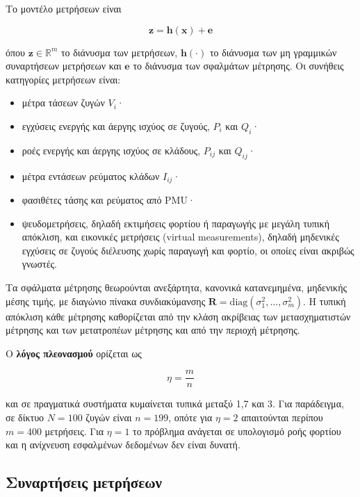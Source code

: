 Το μοντέλο μετρήσεων είναι

\begin{equation}
\mathbf{z} = \mathbf{h}(\mathbf{x}) + \mathbf{e}
\label{eq:measmodel}
\end{equation}

όπου $\mathbf{z} \in \mathbb{R}^{m}$ το διάνυσμα των μετρήσεων, $\mathbf{h}(\cdot)$ το
διάνυσμα των μη γραμμικών συναρτήσεων μετρήσεων και $\mathbf{e}$ το διάνυσμα των σφαλμάτων
μέτρησης. Οι συνήθεις κατηγορίες μετρήσεων είναι:

\begin{itemize}
\item μέτρα τάσεων ζυγών $V_i$·
\item εγχύσεις ενεργής και άεργης ισχύος σε ζυγούς, $P_i$ και $Q_i$·
\item ροές ενεργής και άεργης ισχύος σε κλάδους, $P_{ij}$ και $Q_{ij}$·
\item μέτρα εντάσεων ρεύματος κλάδων $I_{ij}$·
\item φασιθέτες τάσης και ρεύματος από PMU·
\item ψευδομετρήσεις, δηλαδή εκτιμήσεις φορτίου ή παραγωγής με μεγάλη τυπική απόκλιση, και
      εικονικές μετρήσεις (virtual measurements), δηλαδή μηδενικές εγχύσεις σε ζυγούς
      διέλευσης χωρίς παραγωγή και φορτίο, οι οποίες είναι ακριβώς γνωστές.
\end{itemize}

Τα σφάλματα μέτρησης θεωρούνται ανεξάρτητα, κανονικά κατανεμημένα, μηδενικής μέσης τιμής, με
διαγώνιο πίνακα συνδιακύμανσης $\mathbf{R} = \mathrm{diag}(\sigma_1^2, \ldots, \sigma_m^2)$. Η
τυπική απόκλιση κάθε μέτρησης καθορίζεται από την κλάση ακρίβειας των μετασχηματιστών μέτρησης
και των μετατροπέων μέτρησης και από την περιοχή μέτρησης.

Ο \textbf{λόγος πλεονασμού} ορίζεται ως

\begin{equation}
\eta = \frac{m}{n}
\label{eq:redundancy}
\end{equation}

και σε πραγματικά συστήματα κυμαίνεται τυπικά μεταξύ 1,7 και 3. Για παράδειγμα, σε δίκτυο
$N = 100$ ζυγών είναι $n = 199$, οπότε για $\eta = 2$ απαιτούνται περίπου $m = 400$
μετρήσεις. Για $\eta = 1$ το πρόβλημα ανάγεται σε υπολογισμό ροής φορτίου και η ανίχνευση
εσφαλμένων δεδομένων δεν είναι δυνατή.

\subsection{Συναρτήσεις μετρήσεων}
\label{sec:meas-func}

